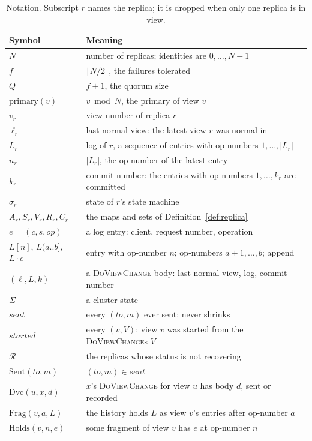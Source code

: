 \documentclass[11pt,a4paper]{article}
\theoremstyle{plain}
\theoremstyle{definition}
\theoremstyle{remark}
\newcommand{\msg}[1]{\textsc{#1}}
\newcommand{\dvc}{\msg{DoViewChange}}
\newcommand{\Frag}{\mathrm{Frag}}
\newcommand{\Holds}{\mathrm{Holds}}
\newcommand{\Sent}{\mathrm{Sent}}
\newcommand{\primary}{\mathrm{primary}}
\newcommand{\sent}{\mathit{sent}}
\newcommand{\started}{\mathit{started}}
\begin{document}
\begin{table}[t]
\centering
\small
\caption{Notation. Subscript $r$ names the replica; it is dropped when
only one replica is in view.}
\label{tab:notation}
\begin{tabular}{@{}ll@{}}
\toprule
Symbol & Meaning \\
\midrule
$N$ & number of replicas; identities are $0, \dots, N-1$ \\
$f$ & $\lfloor N/2 \rfloor$, the failures tolerated \\
$Q$ & $f + 1$, the quorum size \\
$\primary(v)$ & $v \bmod N$, the primary of view $v$ \\
\addlinespace
$v_r$ & view number of replica $r$ \\
$\ell_r$ & last normal view: the latest view $r$ was normal in \\
$L_r$ & log of $r$, a sequence of entries with op-numbers $1, \dots, |L_r|$ \\
$n_r$ & $|L_r|$, the op-number of the latest entry \\
$k_r$ & commit number: the entries with op-numbers $1, \dots, k_r$ are committed \\
$\sigma_r$ & state of $r$'s state machine \\
$A_r, S_r, V_r, R_r, C_r$ & the maps and sets of Definition~\ref{def:replica} \\
\addlinespace
$e = (c, s, \mathit{op})$ & a log entry: client, request number, operation \\
$L[n]$, $L(a{..}b]$, $L \cdot e$ & entry with op-number $n$; op-numbers $a+1, \dots, b$; append \\
$(\ell, L, k)$ & a \dvc{} body: last normal view, log, commit number \\
\addlinespace
$\Sigma$ & a cluster state \\
$\sent$ & every $(\mathit{to}, m)$ ever sent; never shrinks \\
$\started$ & every $(v, V)$: view $v$ was started from the \dvc{}s $V$ \\
$\mathcal{R}$ & the replicas whose status is not recovering \\
$\Sent(\mathit{to}, m)$ & $(\mathit{to}, m) \in \sent$ \\
$\mathrm{Dvc}(u, x, d)$ & $x$'s \dvc{} for view $u$ has body $d$, sent or recorded \\
\addlinespace
$\Frag(v, a, L)$ & the history holds $L$ as view $v$'s entries after op-number $a$ \\
$\Holds(v, n, e)$ & some fragment of view $v$ has $e$ at op-number $n$ \\

\end{tabular}
\end{table}
\end{document}

